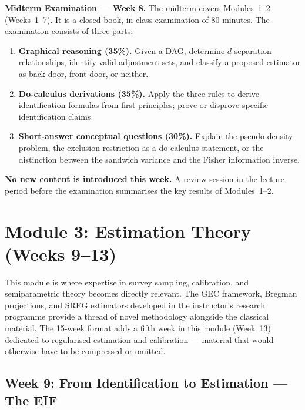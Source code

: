 \documentclass[12pt]{article}
\begin{document}
\begin{exambox}
\noindent\textbf{\color{darkblue}Midterm Examination --- Week 8.}
The midterm covers Modules~1--2 (Weeks~1--7).  It is a closed-book,
in-class examination of 80 minutes.  The examination consists of three
parts:

\begin{enumerate}
  \item \textbf{Graphical reasoning (35\%).}
    Given a DAG, determine $d$-separation relationships, identify valid
    adjustment sets, and classify a proposed estimator as back-door,
    front-door, or neither.

  \item \textbf{Do-calculus derivations (35\%).}
    Apply the three rules to derive identification formulas from first
    principles; prove or disprove specific identification claims.

  \item \textbf{Short-answer conceptual questions (30\%).}
    Explain the pseudo-density problem, the exclusion restriction as a
    do-calculus statement, or the distinction between the sandwich
    variance and the Fisher information inverse.
\end{enumerate}

\noindent\textbf{No new content is introduced this week.}
A review session in the lecture period before the examination summarises
the key results of Modules~1--2.
\end{exambox}

\section{Module 3: Estimation Theory (Weeks 9--13)}

This module is where expertise in survey sampling, calibration, and
semiparametric theory becomes directly relevant.  The GEC framework,
Bregman projections, and SREG estimators developed in the instructor's
research programme provide a thread of novel methodology alongside the
classical material.  The 15-week format adds a fifth week in this module
(Week~13) dedicated to regularised estimation and calibration --- material
that would otherwise have to be compressed or omitted.

\subsection{Week 9: From Identification to Estimation --- The EIF}
\end{document}
